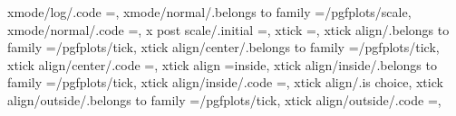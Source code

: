{{{{{{{{{{{xmode/log/.code                                                    ={\pgfplots@xislinearfalse},                                                                                                        
xmode/normal/.belongs to family                                    =/pgfplots/scale,                                                                                                                   
xmode/normal/.code                                                 ={\pgfplots@xislineartrue},                                                                                                         
x post scale/.initial                                              =,                                                                                                                                  
xtick                                                              =,                                                                                                                                  
xtick align/.belongs to family                                     =/pgfplots/tick,                                                                                                                    
xtick align/center/.belongs to family                              =/pgfplots/tick,                                                                                                                    
xtick align/center/.code                                           ={\def\pgfplots@xtickalignnum{2}},                                                                                                  
xtick align                                                        =inside,                                                                                                                            
xtick align/inside/.belongs to family                              =/pgfplots/tick,                                                                                                                    
xtick align/inside/.code                                           ={\def\pgfplots@xtickalignnum{0}},                                                                                                  
xtick align/.is choice,
xtick align/outside/.belongs to family                             =/pgfplots/tick,                                                                                                                    
xtick align/outside/.code                                          ={\def\pgfplots@xtickalignnum{1}},                                                                                                  
}}}}}}}}}}}
